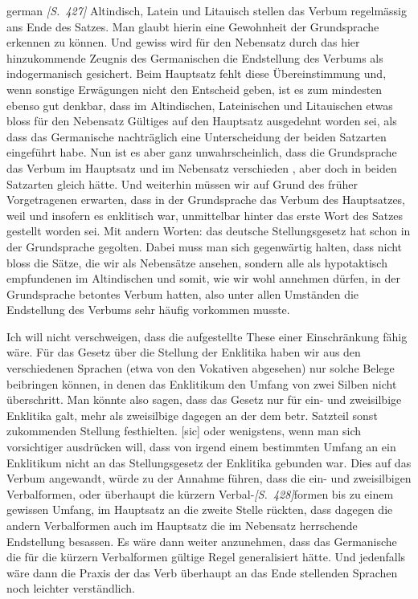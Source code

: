 \begin{otherlanguage*}{german}
\hypertarget{p427}{\emph{[S.~427]}}\label{p427} Altindisch, Latein und Litauisch stellen das Verbum regelmässig ans Ende des Satzes. Man glaubt hierin eine Gewohnheit der Grundsprache erkennen zu können. Und gewiss wird für den Nebensatz durch das hier hinzukommende Zeugnis des Germanischen die Endstellung des Verbums als indogermanisch gesichert. Beim Hauptsatz fehlt diese Übereinstimmung und, wenn sonstige Erwägungen nicht den Entscheid geben, ist es zum mindesten ebenso gut denkbar, dass im Altindischen, Lateinischen und Litauischen etwas bloss für den Nebensatz Gültiges auf den Hauptsatz ausgedehnt worden sei, als dass das Germanische nachträglich eine Unterscheidung der beiden Satzarten eingeführt habe. Nun ist es aber ganz unwahrscheinlich, dass die Grundsprache das Verbum im Hauptsatz und im Nebensatz verschieden , aber doch in beiden Satzarten gleich  hätte. Und weiterhin müssen wir auf Grund des früher Vorgetragenen erwarten, dass in der Grundsprache das Verbum des Hauptsatzes, weil und insofern es enklitisch war, unmittelbar hinter das erste Wort des Satzes gestellt worden sei. Mit andern Worten: das deutsche Stellungsgesetz hat schon in der Grundsprache gegolten. Dabei muss man sich gegenwärtig halten, dass nicht bloss die Sätze, die wir als Nebensätze ansehen, sondern alle als hypotaktisch empfundenen im Altindischen und somit, wie wir wohl annehmen dürfen, in der Grundsprache betontes Verbum hatten, also unter allen Umständen die Endstellung des Verbums sehr häufig vorkommen musste.

Ich will nicht verschweigen, dass die aufgestellte These einer Einschränkung fähig wäre. Für das Gesetz über die Stellung der Enklitika haben wir aus den verschiedenen Sprachen (etwa von den Vokativen abgesehen) nur solche Belege beibringen können, in denen das Enklitikum den Umfang von zwei Silben nicht überschritt.  Man könnte also sagen, dass das Gesetz nur für ein- und zweisilbige Enklitika galt, mehr als zweisilbige dagegen an der dem betr. Satzteil sonst zukommenden Stellung festhielten. [sic] oder wenigstens, wenn man sich vorsichtiger ausdrücken will, dass von irgend einem bestimmten Umfang an ein Enklitikum nicht an das Stellungsgesetz der Enklitika gebunden war. Dies auf das Verbum angewandt, würde zu der Annahme führen, dass die ein- und zweisilbigen Verbalformen, oder überhaupt die kürzern Verbal-\hypertarget{p428}{\emph{[S.~428]}}\label{p428}formen bis zu einem gewissen Umfang, im Hauptsatz an die zweite Stelle rückten, dass dagegen die andern Verbalformen auch im Hauptsatz die im Nebensatz herrschende Endstellung besassen. Es wäre dann weiter anzunehmen, dass das Germanische die für die kürzern Verbalformen gültige Regel generalisiert hätte. Und jedenfalls wäre dann die Praxis der das Verb überhaupt an das Ende stellenden Sprachen noch leichter verständlich.


\end{otherlanguage*}
